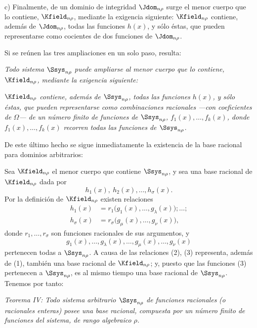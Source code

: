 \documentclass[11pt]{article}
\begin{document}
c) Finalmente, de un dominio de integridad $\Jdom_{n\rho}$ surge el menor cuerpo que lo contiene, $\Kfield_{n\rho}$, mediante la exigencia siguiente: $\Kfield_{n\rho}$ contiene, además de $\Jdom_{n\rho}$, todas las funciones $h(x)$, y sólo éstas, que pueden representarse como cocientes de dos funciones de $\Jdom_{n\rho}$.

Si se reúnen las tres ampliaciones en un solo paso, resulta:

\emph{Todo sistema $\Ssys_{n\rho}$ puede ampliarse al menor cuerpo que lo contiene, $\Kfield_{n\rho}$, mediante la exigencia siguiente:}

\emph{$\Kfield_{n\rho}$ contiene, además de $\Ssys_{n\rho}$, todas las funciones $h(x)$, y sólo éstas, que pueden representarse como combinaciones racionales ---con coeficientes de $\Omega$--- de un número finito de funciones de $\Ssys_{n\rho}$, $f_1(x),\ldots,f_k(x)$, donde $f_1(x),\ldots,f_k(x)$ recorren todas las funciones de $\Ssys_{n\rho}$.}

De este último hecho se sigue inmediatamente la existencia de la base racional para dominios arbitrarios:

Sea $\Kfield_{n\rho}$ el menor cuerpo que contiene $\Ssys_{n\rho}$, y sea una base racional de $\Kfield_{n\rho}$ dada por
\begin{equation}
  h_1(x),\ h_2(x),\ldots,h_\sigma(x).
\tag{1}
\end{equation}
Por la definición de $\Kfield_{n\rho}$ existen relaciones
\begin{equation}
\begin{aligned}
 h_1(x)&=r_1\bigl(g_1(x),\ldots,g_\lambda(x)\bigr);\ldots;\\
 h_\sigma(x)&=r_\sigma\bigl(g_\mu(x),\ldots,g_\nu(x)\bigr),
\end{aligned}
\tag{2}
\end{equation}
donde $r_1,
\ldots,r_\sigma$ son funciones racionales de sus argumentos, y
\begin{equation}
  g_1(x),\ldots,g_\lambda(x),\ldots,
  g_\mu(x),\ldots,g_\nu(x)
\tag{3}
\end{equation}
pertenecen todas a $\Ssys_{n\rho}$. A causa de las relaciones (2), (3) representa, además de (1), también una base racional de $\Kfield_{n\rho}$; y, puesto que las funciones (3) pertenecen a $\Ssys_{n\rho}$, es al mismo tiempo una base racional de $\Ssys_{n\rho}$. Tenemos por tanto:

\emph{Teorema IV: Todo sistema arbitrario $\Ssys_{n\rho}$ de funciones racionales (o racionales enteras) posee una base racional, compuesta por un número finito de funciones del sistema, de rango algebraico $\rho$.}
\end{document}
